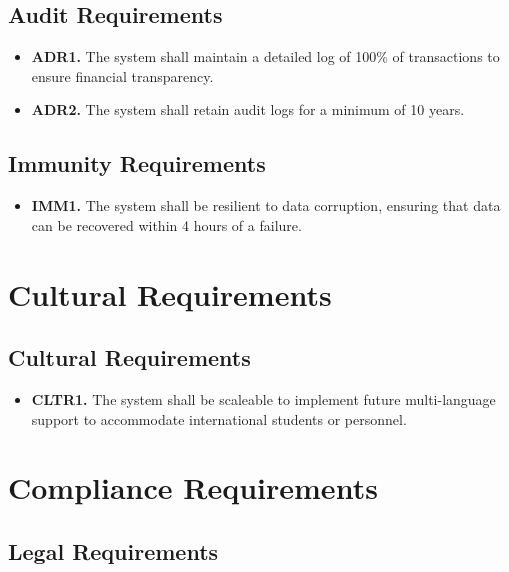 \documentclass[12pt]{article}
\begin{document}
\subsection{Audit Requirements}

\label{ADR}

\begin{itemize}
    \item \textbf{ADR1.} The system shall maintain a detailed log of 100\% of transactions to ensure financial transparency.
    \item \textbf{ADR2.} The system shall retain audit logs for a minimum of 10 years.
\end{itemize}
\subsection{Immunity Requirements}

\label{IMM}

\begin{itemize}
    \item \textbf{IMM1.} The system shall be resilient to data corruption, ensuring that data can be recovered within 4 hours of a failure.
\end{itemize}

\section{Cultural Requirements}
\subsection{Cultural Requirements}

\label{CLTR}

\begin{itemize}
    \item \textbf{CLTR1.} The system shall be scaleable to implement future multi-language support to accommodate international students or personnel.
\end{itemize}

\section{Compliance Requirements}
\subsection{Legal Requirements}

\label{LR}
\end{document}
